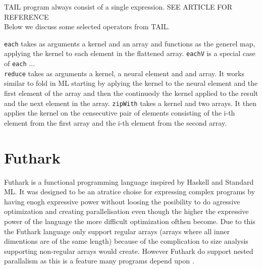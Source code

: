\documentclass[11pt]{article}
\begin{document}
TAIL program always consist of a single expression. SEE ARTICLE FOR REFERENCE \\

Below we discuss some selected operators from TAIL.

{\tt each} takes as arguments a kernel and an array and functions as the generel map, applying the kernel to each element in the flattened array. 
{\tt eachV} is a special case of {\tt each} ...\\
{\tt reduce} takes as arguments a kernel, a neural element and and array. It works similar to fold in ML starting by aplying the kernel to the neural element and the first element of the array and then the continuesly the kernel applied to the result and the next element in the array. 
{\tt zipWith} takes a kernel and two arrays. It then applies the kernel on the censecutive pair of elements consisting of the i-th element from the first array and the i-th element from the second array. 




 



\section{Futhark}

Futhark is a functional programming language inspired by Haskell and Standard ML. It was designed to be an atratice choise for expressing complex programs by having enogh expressive power without loosing the posibility to do agressive optimization and creating parallelisation even though the higher the expressive power of the language the more difficult optimization ofthen become. Due to this the Futhark language only support regular arrays (arrays where all inner dimentions are of the same length) because of the complication to size analysis supporting non-regular arrays would create.
However Futhark do support nested parallalism as this is a feature many programs depend upon \cite{Henriksen}.\\
\end{document}
